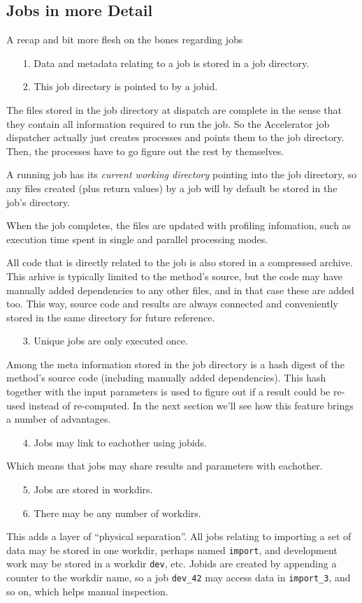 \documentclass[a4paper]{article}
\begin{document}
\clearpage



\subsection{Jobs in more Detail}
A recap and bit more flesh on the bones regarding jobs
\begin{itemize}
\item[1.]  Data and metadata relating to a job is stored in a job directory.
\item[2.]  This job directory is pointed to by a jobid.
\end{itemize}
The files stored in the job directory at dispatch are complete in the
sense that they contain all information required to run the job.  So
the Accelerator job dispatcher actually just creates processes and
points them to the job directory.  Then, the processes have to go
figure out the rest by themselves.

A running job has its \textsl{current working directory} pointing into
the job directory, so any files created (plus return values) by a job
will by default be stored in the job's directory.

When the job completes, the files are updated with profiling
infomation, such as execution time spent in single and parallel
processing modes.

All code that is directly related to the job is also stored in a
compressed archive.  This arhive is typically limited to the method's
source, but the code may have manually added dependencies to any other
files, and in that case these are added too.  This way, source code
and results are always connected and conveniently stored in the same
directory for future reference.
\begin{itemize}
\item[3.]  Unique jobs are only executed once.
\end{itemize}
Among the meta information stored in the job directory is a hash
digest of the method's source code (including manually added
dependencies).  This hash together with the input parameters is used
to figure out if a result could be re-used instead of re-computed.  In
the next section we'll see how this feature brings a number of
advantages.
\begin{itemize}
\item[4.]  Jobs may link to eachother using jobids.
\end{itemize}
Which means that jobs may share results and parameters with eachother.
\begin{itemize}
\item[5.]  Jobs are stored in workdirs.
\item[6.]  There may be any number of workdirs.
\end{itemize}
This adds a layer of ``physical separation''.  All jobs relating to
importing a set of data may be stored in one workdir, perhaps named
\texttt{import}, and development work may be stored in a workdir
\texttt{dev}, etc.  Jobids are created by appending a counter to the
workdir name, so a job \texttt{dev\_42} may access data in
\texttt{import\_3}, and so on, which helps manual inspection.
\end{document}
